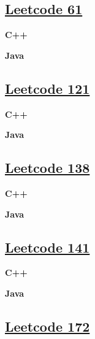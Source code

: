 \subsection{\href{https://leetcode-cn.com/}{Leetcode 61}}\label{app:codelist:leetcode:61}

\textbf{C++}\par


\textbf{Java}\par



\subsection{\href{https://leetcode-cn.com/}{Leetcode 121}}\label{app:codelist:leetcode:121}

\textbf{C++}\par


\textbf{Java}\par



\subsection{\href{https://leetcode-cn.com/}{Leetcode 138}}\label{app:codelist:leetcode:138}

\textbf{C++}\par


\textbf{Java}\par



\subsection{\href{https://leetcode-cn.com/}{Leetcode 141}}\label{app:codelist:leetcode:141}

\textbf{C++}\par


\textbf{Java}\par



\subsection{\href{https://leetcode-cn.com/}{Leetcode 172}}\label{app:codelist:leetcode:172}

